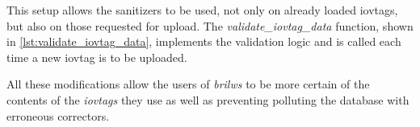 This setup allows the sanitizers to be used, not only on already loaded iovtags, but also on those requested for upload. The \textit{validate\_iovtag\_data} function, shown in \autoref{lst:validate_iovtag_data}, implements the validation logic and is called each time a new iovtag is to be uploaded.

All these modifications allow the users of \textit{brilws} to be more certain of the contents of the \textit{iovtags} they use as well as preventing polluting the database with erroneous correctors.







